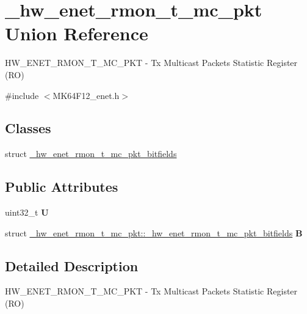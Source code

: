 \hypertarget{union__hw__enet__rmon__t__mc__pkt}{}\section{\+\_\+hw\+\_\+enet\+\_\+rmon\+\_\+t\+\_\+mc\+\_\+pkt Union Reference}
\label{union__hw__enet__rmon__t__mc__pkt}


H\+W\+\_\+\+E\+N\+E\+T\+\_\+\+R\+M\+O\+N\+\_\+\+T\+\_\+\+M\+C\+\_\+\+P\+KT -\/ Tx Multicast Packets Statistic Register (RO)  




{\ttfamily \#include $<$M\+K64\+F12\+\_\+enet.\+h$>$}

\subsection*{Classes}
\begin{DoxyCompactItemize}
\item 
struct \hyperlink{struct__hw__enet__rmon__t__mc__pkt_1_1__hw__enet__rmon__t__mc__pkt__bitfields}{\+\_\+hw\+\_\+enet\+\_\+rmon\+\_\+t\+\_\+mc\+\_\+pkt\+\_\+bitfields}
\end{DoxyCompactItemize}
\subsection*{Public Attributes}
\begin{DoxyCompactItemize}
\item 
uint32\+\_\+t {\bfseries U}\hypertarget{union__hw__enet__rmon__t__mc__pkt_a6e929892b7a51d9bffa952f10d553d7b}{}\label{union__hw__enet__rmon__t__mc__pkt_a6e929892b7a51d9bffa952f10d553d7b}

\item 
struct \hyperlink{struct__hw__enet__rmon__t__mc__pkt_1_1__hw__enet__rmon__t__mc__pkt__bitfields}{\+\_\+hw\+\_\+enet\+\_\+rmon\+\_\+t\+\_\+mc\+\_\+pkt\+::\+\_\+hw\+\_\+enet\+\_\+rmon\+\_\+t\+\_\+mc\+\_\+pkt\+\_\+bitfields} {\bfseries B}\hypertarget{union__hw__enet__rmon__t__mc__pkt_a0e97d9f8dac5f21ac4a508a90783404e}{}\label{union__hw__enet__rmon__t__mc__pkt_a0e97d9f8dac5f21ac4a508a90783404e}

\end{DoxyCompactItemize}


\subsection{Detailed Description}
H\+W\+\_\+\+E\+N\+E\+T\+\_\+\+R\+M\+O\+N\+\_\+\+T\+\_\+\+M\+C\+\_\+\+P\+KT -\/ Tx Multicast Packets Statistic Register (RO) 

